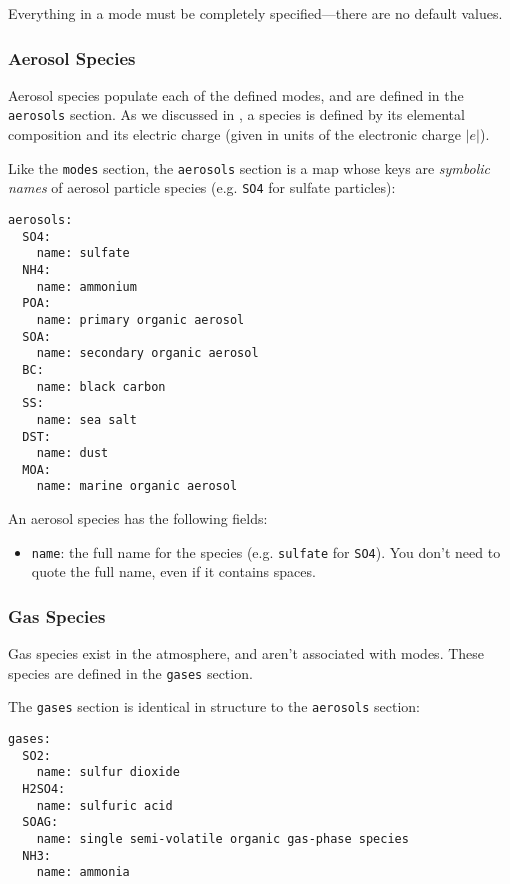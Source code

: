 Everything in a mode must be completely specified---there are no default values.

\subsubsection*{Aerosol Species}

Aerosol species populate each of the defined modes, and are defined in the
\texttt{aerosols} section. As we discussed in , a
species is defined by its elemental composition and its electric charge (given
in units of the electronic charge $|e|$).

Like the \texttt{modes} section, the \texttt{aerosols} section is a map whose keys
are {\em symbolic names} of aerosol particle species (e.g. \texttt{SO4} for
sulfate particles):

\begin{verbatim}
aerosols:
  SO4:
    name: sulfate
  NH4:
    name: ammonium
  POA:
    name: primary organic aerosol
  SOA:
    name: secondary organic aerosol
  BC:
    name: black carbon
  SS:
    name: sea salt
  DST:
    name: dust
  MOA:
    name: marine organic aerosol
\end{verbatim}

An aerosol species has the following fields:

\begin{itemize}
  \item \texttt{name}: the full name for the species (e.g. \texttt{sulfate} for
    \texttt{SO4}). You don't need to quote the full name, even if it contains
    spaces.
\end{itemize}

\subsubsection*{Gas Species}

Gas species exist in the atmosphere, and aren't associated with modes. These
species are defined in the \texttt{gases} section.

The \texttt{gases} section is identical in structure to the
\texttt{aerosols} section:

\begin{verbatim}
gases:
  SO2:
    name: sulfur dioxide
  H2SO4:
    name: sulfuric acid
  SOAG:
    name: single semi-volatile organic gas-phase species
  NH3:
    name: ammonia
\end{verbatim}

